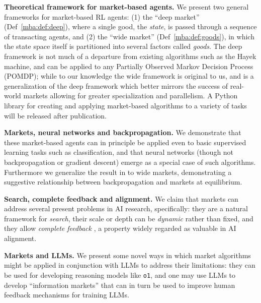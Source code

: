 \textbf{Theoretical framework for market-based agents.} We present two general frameworks for market-based RL agents: (1) the ``deep market'' (Def~\ref{mba:def:deep}), where a single good, the \emph{state}, is passed through a sequence of transacting agents, and (2) the ``wide market'' (Def~\ref{mba:def:goods}), in which the state space itself is partitioned into several factors called \emph{goods}. The deep framework is not much of a departure from existing algorithms such as the Hayek machine, and can be applied to any Partially Observed Markov Decision Process (POMDP); while to our knowledge the wide framework is original to us, and is a generalization of the deep framework which better mirrors the success of real-world markets allowing for greater specialization and parallelism. A Python library for creating and applying market-based algorithms to a variety of tasks will be released after publication.

\textbf{Markets, neural networks and backpropagation.} We demonstrate that these market-based agents can in principle be applied even to basic supervised learning tasks such as classification, and that neural networks (though not backpropagation or gradient descent) emerge as a special case of such algorithms. Furthermore we generalize the result in \citet{wentworthCompetitiveMarketsDistributed2018} to wide markets, demonstrating a suggestive relationship between backpropagation and markets at equilibrium.

\textbf{Search, complete feedback and alignment.} We claim that markets can address several present problems in AI research, specifically: they are a natural framework for \emph{search}, their scale or depth can be \emph{dynamic} rather than fixed, and they allow \emph{complete feedback} \citep{demskiCompleteFeedback2024}, a property widely regarded as valuable in AI alignment.

\textbf{Markets and LLMs.} We present some novel ways in which market algorithms might be applied in conjunction with LLMs to address their limitations: they can be used for developing reasoning models like \texttt{o1}, and one may use LLMs to develop ``information markets'' that can in turn be used to improve human feedback mechanisms for training LLMs.


